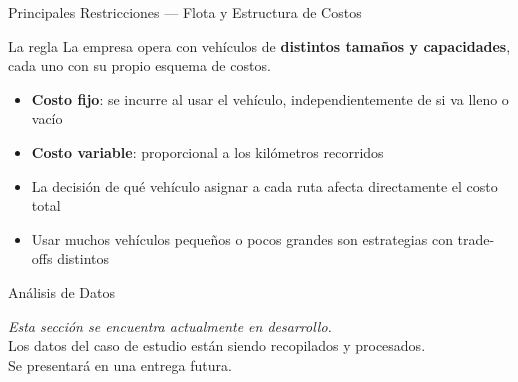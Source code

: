 \documentclass[10pt, aspectratio=169]{beamer}
\begin{document}
\begin{frame}{Principales Restricciones — Flota y Estructura de Costos}

  \begin{block}{La regla}
    La empresa opera con vehículos de \textbf{distintos tamaños y capacidades}, cada uno con su propio esquema de costos.
  \end{block}

  \vspace{10pt}
  \begin{itemize}\setlength\itemsep{10pt}
    \item \textbf{Costo fijo}: se incurre al usar el vehículo, independientemente de si va lleno o vacío
    \item \textbf{Costo variable}: proporcional a los kilómetros recorridos
    \item La decisión de qué vehículo asignar a cada ruta afecta directamente el costo total
    \item Usar muchos vehículos pequeños o pocos grandes son estrategias con trade-offs distintos
  \end{itemize}

\end{frame}

\begin{frame}{Análisis de Datos}

  \vspace{20pt}
  \begin{block}{}
    \centering
    \vspace{8pt}
    \textit{Esta sección se encuentra actualmente en desarrollo.}\\[4pt]
    Los datos del caso de estudio están siendo recopilados y procesados.\\[4pt]
    Se presentará en una entrega futura.
    \vspace{8pt}
  \end{block}

\end{frame}
\end{document}
